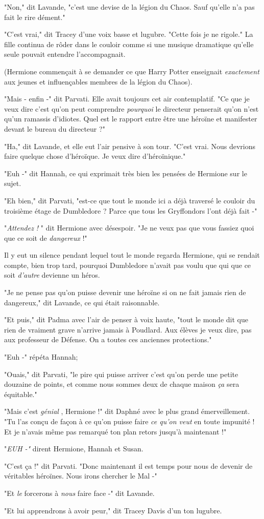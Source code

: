 "Non," dit Lavande, "c'est une devise de la légion du Chaos. Sauf qu'elle n'a pas fait le rire dément."

"C'est vrai," dit Tracey d'une voix basse et lugubre. "Cette fois je ne rigole." La fille continua de rôder dans le couloir comme si une musique dramatique qu'elle seule pouvait entendre l'accompagnait.

(Hermione commençait à se demander ce que Harry Potter enseignait \emph{exactement}  aux jeunes et influençables membres de la légion du Chaos).

"Mais - enfin -" dit Parvati. Elle avait toujours cet air contemplatif. "Ce que je veux dire c'est qu'on peut comprendre \emph{pourquoi}  le directeur penserait qu'on n'est qu'un ramassis d'idiotes. Quel est le rapport entre être une héroïne et manifester devant le bureau du directeur ?"

"Ha," dit Lavande, et elle eut l'air pensive à son tour. "C'est vrai. Nous devrions faire quelque chose d'héroïque. Je veux dire d'héroïnique."

"Euh -" dit Hannah, ce qui exprimait très bien les pensées de Hermione sur le sujet.

"Eh bien," dit Parvati, "est-ce que tout le monde ici a déjà traversé le couloir du troisième étage de Dumbledore ? Parce que tous les Gryffondors l'ont déjà fait -"

"\emph{Attendez !} " dit Hermione avec désespoir. "Je ne veux pas que vous fassiez quoi que ce soit de \emph{dangereux}  !"

Il y eut un silence pendant lequel tout le monde regarda Hermione, qui se rendait compte, bien trop tard, pourquoi Dumbledore n'avait pas voulu que qui que ce soit \emph{d'autre}  devienne un héros.

"Je ne pense pas qu'on puisse devenir une héroïne si on ne fait jamais rien de dangereux," dit Lavande, ce qui était raisonnable.

"Et puis," dit Padma avec l'air de penser à voix haute, "tout le monde dit que rien de vraiment grave n'arrive jamais à Poudlard. Aux élèves je veux dire, pas aux professeur de Défense. On a toutes ces anciennes protections."

"Euh -" répéta Hannah;

"Ouais," dit Parvati, "le pire qui puisse arriver c'est qu'on perde une petite douzaine de points, et comme nous sommes deux de chaque maison \emph{ça}  sera équitable."

"Mais c'est \emph{génial} , Hermione !" dit Daphné avec le plus grand émerveillement. "Tu l'as conçu de façon à ce qu'on puisse faire \emph{ce qu'on veut}  en toute impunité ! Et je n'avais même pas remarqué ton plan retors jusqu'à maintenant !"

"\emph{EUH -" } dirent Hermione, Hannah et Susan.

"C'est ça !" dit Parvati. "Donc maintenant il est temps pour nous de devenir de véritables héroïnes. Nous irons chercher le Mal -"

"Et \emph{le}  forcerons à \emph{nous}  faire face -" dit Lavande.

"Et lui apprendrons à avoir peur," dit Tracey Davis d'un ton lugubre.

